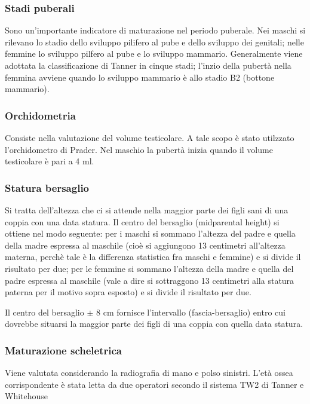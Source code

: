 \subsubsection*{Stadi puberali}
Sono un'importante indicatore di maturazione nel periodo puberale. Nei maschi si rilevano lo stadio dello sviluppo pilifero al pube e dello sviluppo dei genitali; nelle femmine lo sviluppo pilfero al pube e lo sviluppo mammario. Generalmente viene adottata la classificazione di Tanner\cite{tanner1990foetus} in cinque stadi; l'inzio della pubertà nella femmina avviene quando lo sviluppo mammario è allo stadio B2 (bottone mammario). 

\subsubsection*{Orchidometria}
Consiste nella valutazione del volume testicolare. A tale scopo è stato utilzzato l'orchidometro di Prader. Nel maschio la pubertà inizia quando il volume testicolare è pari a 4 ml.  


\subsubsection*{Statura bersaglio}
Si tratta dell'altezza che ci si attende nella maggior parte dei figli sani di una coppia con una data statura. Il centro del bersaglio (midparental height) si ottiene nel modo seguente: per i maschi si sommano l'altezza del padre e quella della madre espressa al maschile (cioè si aggiungono 13 centimetri all'altezza materna, perchè tale è la differenza statistica fra maschi e femmine) e si divide il risultato per due; per le femmine si sommano l'altezza della madre e quella del padre espressa al maschile (vale a dire si sottraggono 13 centimetri alla statura paterna per il motivo sopra esposto) e si divide il risultato per due. 

Il centro del bersaglio $\pm$ 8 cm fornisce l'intervallo (fascia-bersaglio) entro cui dovrebbe situarsi la maggior parte dei figli di una coppia con quella data statura.


\subsubsection*{Maturazione scheletrica}
Viene valutata considerando la radiografia di mano e polso sinistri. L'età ossea corrispondente è stata letta da due operatori secondo il sistema TW2 di Tanner e Whitehouse%


